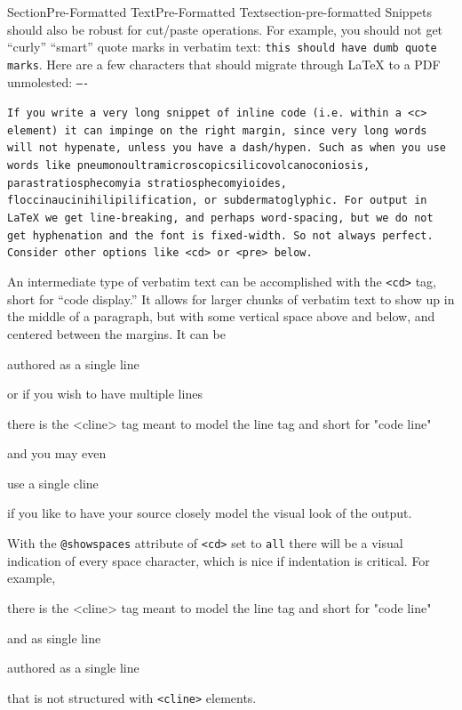 \documentclass[twoside,10pt,]{article}
\newcommand{\mono}[1]{\texttt{#1}}
\numberwithin{equation}{section}
\begin{document}
\begin{sectionptx}{Section}{Pre-Formatted Text}{}{Pre-Formatted Text}{}{}{section-pre-formatted}
Snippets should also be robust for cut\slash{}paste operations.  For example, you should not get ``curly'' ``smart'' quote marks in verbatim text: \mono{this should have \textquotedbl{}dumb\textquotedbl{} quote marks}. Here are a few characters that should migrate through \LaTeX{} to a PDF unmolested:  \mono{\textquotesingle{}\textquotedbl{}----\textquotedbl{}\textquotesingle{}}%
\par
\mono{If you write a very long snippet of inline code (i.e. within a <c> element) it can impinge on the right margin, since very long words will not hypenate, unless you have a dash/hypen.  Such as when you use words like pneumonoultramicroscopicsilicovolcanoconiosis, parastratiosphecomyia stratiosphecomyioides, floccinaucinihilipilification, or subdermatoglyphic.  For output in LaTeX we get line-breaking, and perhaps word-spacing, but we do not get hyphenation and the font is fixed-width.  So not always perfect.  Consider other options like <cd> or <pre> below.}%
\par
An intermediate type of verbatim text can be accomplished with the \mono{<cd>} tag, short for ``code display.''  It allows for larger chunks of verbatim text to show up in the middle of a paragraph, but with some vertical space above and below, and centered between the margins.  It can be%
\begin{codedisplay}
authored as a single line
\end{codedisplay}
or if you wish to have multiple lines%
\begin{codedisplay}
there is the <cline> tag
meant to model the line tag
and short for "code line"
\end{codedisplay}
and you may even%
\begin{codedisplay}
use a single cline
\end{codedisplay}
if you like to have your source closely model the visual look of the output.%
\par
With the \mono{@showspaces} attribute of \mono{<cd>} set to \mono{all} there will be a visual indication of every space character, which is nice if indentation is critical.  For example,%
\begin{codedisplay}[showspaces=true]
there is the <cline> tag
    meant to model the line tag
        and short for "code line"
\end{codedisplay}
and as single line%
\begin{codedisplay}[showspaces=true]
authored as a single line
\end{codedisplay}
that is not structured with \mono{<cline>} elements.%

\end{sectionptx}
\end{document}
